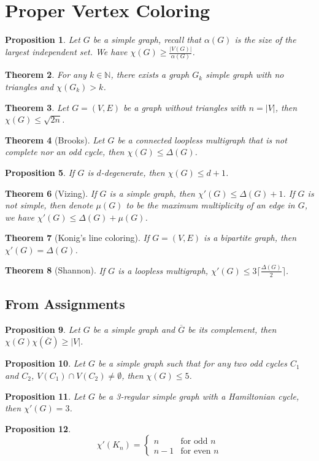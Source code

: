 \documentclass[paper=a4, fontsize=12pt]{scrartcl} %
\newtheorem{thm}{Theorem}[section]
\newtheorem{prop}[thm]{Proposition}
\theoremstyle{definition}
\theoremstyle{remark}
\newcommand{\N}{\mathbb{N}}
\numberwithin{equation}{section} %
\numberwithin{figure}{section} %
\numberwithin{table}{section} %
\begin{document}
\section{Proper Vertex Coloring}
\begin{prop}
	Let $G$ be a simple graph, recall that $\alpha(G)$ is the size of the largest independent set. We have $\chi(G) \geq \frac{|V(G)|}{\alpha(G)}$.
\end{prop}
\begin{thm}
	For any $k \in \N$, there exists a graph $G_k$ simple graph with no triangles and $\chi(G_k) > k$.
\end{thm}
\begin{thm}
	Let $G = (V,E)$ be a graph without triangles with $n = |V|$, then $\chi(G) \leq \sqrt{2n}$.
\end{thm}
\begin{thm}[Brooks]
	Let $G$ be a connected loopless multigraph that is not complete nor an odd cycle, then $\chi(G) \leq \Delta(G)$.
\end{thm}
\begin{prop}
	If $G$ is $d$-degenerate, then $\chi(G) \leq d+1$.
\end{prop}
\begin{thm}[Vizing]
	If $G$ is a simple graph, then $\chi'(G) \leq \Delta(G)+1$. If $G$ is not simple, then denote $\mu(G)$ to be the maximum multiplicity of an edge in $G$, we have $\chi'(G) \leq \Delta(G)+\mu(G)$.
\end{thm}
\begin{thm}[Konig's line coloring]
	If $G = (V,E)$ is a bipartite graph, then $\chi'(G) = \Delta(G)$.
\end{thm}
\begin{thm}[Shannon]
	If $G$ is a loopless multigraph, $\chi'(G) \leq 3 \lceil \frac{\Delta(G)}{2} \rceil$.
\end{thm}
\subsection{From Assignments}
\begin{prop}
	Let $G$ be a simple graph and $\overline{G}$ be its complement, then $\chi(G)\chi(\overline{G}) \geq |V|$.
\end{prop}
\begin{prop}
	Let $G$ be a simple graph such that for any two odd cycles $C_1$ and $C_2$, $V(C_1) \cap V(C_2) \neq \emptyset$, then $\chi(G) \leq 5$.
\end{prop}
\begin{prop}
	Let $G$ be a 3-regular simple graph with a Hamiltonian cycle, then $\chi'(G) = 3$.
\end{prop}
\begin{prop}
	\[ \chi'(K_n) = \begin{cases}n &\mbox{for odd }n\\n-1&\mbox{for even }n\end{cases}\]
\end{prop}
\end{document}
